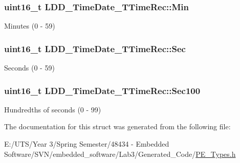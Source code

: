 \subsubsection[{Min}]{\setlength{\rightskip}{0pt plus 5cm}uint16\+\_\+t L\+D\+D\+\_\+\+Time\+Date\+\_\+\+T\+Time\+Rec\+::\+Min}\label{struct_l_d_d___time_date___t_time_rec_a7cea2c409e90bccdc33f19b093020373}
Minutes (0 -\/ 59) \hypertarget{struct_l_d_d___time_date___t_time_rec_a05cccc86e89e5704b0460caaf2429f75}{}
\subsubsection[{Sec}]{\setlength{\rightskip}{0pt plus 5cm}uint16\+\_\+t L\+D\+D\+\_\+\+Time\+Date\+\_\+\+T\+Time\+Rec\+::\+Sec}\label{struct_l_d_d___time_date___t_time_rec_a05cccc86e89e5704b0460caaf2429f75}
Seconds (0 -\/ 59) \hypertarget{struct_l_d_d___time_date___t_time_rec_a2cd2e13e7c478f04ea1c4c460b104491}{}
\subsubsection[{Sec100}]{\setlength{\rightskip}{0pt plus 5cm}uint16\+\_\+t L\+D\+D\+\_\+\+Time\+Date\+\_\+\+T\+Time\+Rec\+::\+Sec100}\label{struct_l_d_d___time_date___t_time_rec_a2cd2e13e7c478f04ea1c4c460b104491}
Hundredths of seconds (0 -\/ 99) 

The documentation for this struct was generated from the following file\+:\begin{DoxyCompactItemize}
\item 
E\+:/\+U\+T\+S/\+Year 3/\+Spring Semester/48434 -\/ Embedded Software/\+S\+V\+N/embedded\+\_\+software/\+Lab3/\+Generated\+\_\+\+Code/\hyperlink{_p_e___types_8h}{P\+E\+\_\+\+Types.\+h}\end{DoxyCompactItemize}
